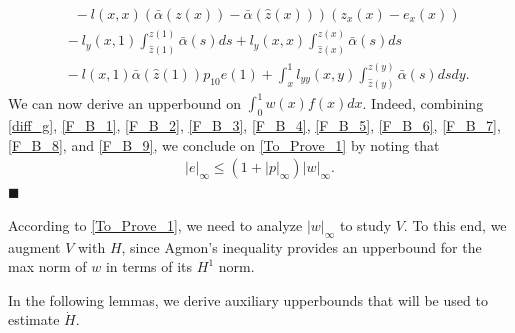 \documentclass[twocolumn]{autart}
\newenvironment{proof}{{\it Proof. }}{\hfill $\blacksquare$ }
\begin{document}
\begin{proof}
\begin{align*}
&~-l(x,x)\left(\bar{\alpha}(z(x))-\bar{\alpha}(\hat{z}(x))\right)(z_x(x)-e_x(x))
\end{align*}
\begin{align*}
&~-l_y(x,1)\int_{\hat{z}(1)}^{z(1)}\bar{\alpha}(s)ds +l_y(x,x)\int_{\hat{z}(x)}^{z(x)}\bar{\alpha}(s)ds \\
&~-l(x,1)\bar{\alpha}(\hat{z}(1))p_{10}e(1) +\int_{x}^{1}l_{yy}(x,y)\int_{\hat{z}(y)}^{z(y)}\bar{\alpha}(s)dsdy. 
\end{align*}
We can now derive an upperbound on $\int_{0}^{1}w(x)f(x)dx$. Indeed, combining \eqref{diff_g}, \eqref{F_B_1}, \eqref{F_B_2}, \eqref{F_B_3}, \eqref{F_B_4}, \eqref{F_B_5}, \eqref{F_B_6}, \eqref{F_B_7}, \eqref{F_B_8}, and \eqref{F_B_9}, we conclude on \eqref{To_Prove_1} by noting that 
\begin{align}
|e|_{\infty} \leq (1+|p|_{\infty})|w|_{\infty}. \label{v_max_bound}
\end{align}
\end{proof}

According to \eqref{To_Prove_1}, we need to analyze $|w|_{\infty}$ to study $V$. To this end, we augment $V$ with $H$, since Agmon's inequality provides an upperbound for the max norm of $w$ in terms of its $H^1$ norm. 

In the following lemmas, we derive auxiliary upperbounds that will be used to estimate $\dot{H}$.
\end{document}

